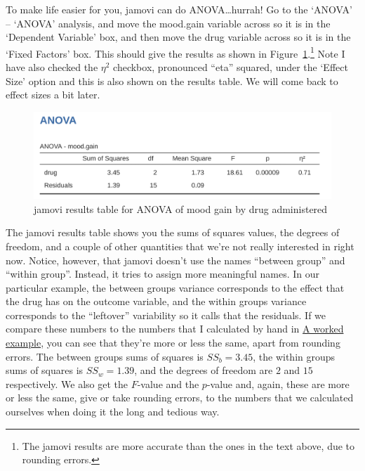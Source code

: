 \documentclass[
  a4paper,
]{book}
\begin{document}
To make life easier for you, jamovi can do ANOVA\ldots hurrah! Go to the
`ANOVA' -- `ANOVA' analysis, and move the mood.gain variable across so
it is in the `Dependent Variable' box, and then move the drug variable
across so it is in the `Fixed Factors' box. This should give the results
as shown in Figure~\ref{fig-fig13-3}.\footnote{The jamovi results are
  more accurate than the ones in the text above, due to rounding errors.}
Note I have also checked the \(\eta^2\) checkbox, pronounced ``eta''
squared, under the `Effect Size' option and this is also shown on the
results table. We will come back to effect sizes a bit later.

\begin{figure}

\includegraphics[width=1\textwidth,height=\textheight]{images/fig13-3.png} \hfill{}

\caption{\label{fig-fig13-3}jamovi results table for ANOVA of mood gain
by drug administered}

\end{figure}

The jamovi results table shows you the sums of squares values, the
degrees of freedom, and a couple of other quantities that we're not
really interested in right now. Notice, however, that jamovi doesn't use
the names ``between group'' and ``within group''. Instead, it tries to
assign more meaningful names. In our particular example, the between
groups variance corresponds to the effect that the drug has on the
outcome variable, and the within groups variance corresponds to the
``leftover'' variability so it calls that the residuals. If we compare
these numbers to the numbers that I calculated by hand in
\protect\hyperlink{a-worked-example}{A worked example}, you can see that
they're more or less the same, apart from rounding errors. The between
groups sums of squares is \(SS_b = 3.45\), the within groups sums of
squares is \(SS_w = 1.39\), and the degrees of freedom are \(2\) and
\(15\) respectively. We also get the \(F\)-value and the \(p\)-value
and, again, these are more or less the same, give or take rounding
errors, to the numbers that we calculated ourselves when doing it the
long and tedious way.
\end{document}
